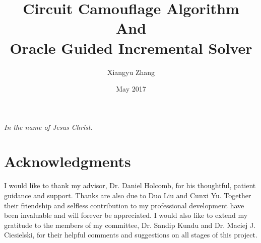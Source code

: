 \documentclass[thesis]{umassthesis}  %
\begin{document}
\title{Circuit Camouflage Algorithm\protect\\And\protect\\Oracle Guided Incremental Solver}
\author{Xiangyu Zhang}
\date{May 2017} %




\frontmatter
\maketitle
\signaturepage

\begin{dedication}              %
  \begin{center}
    \emph{In the name of Jesus Christ.}
  \end{center}
\end{dedication}


%
%
\chapter{Acknowledgments}             %
I would like to thank my advisor, Dr. Daniel Holcomb, for his thoughtful, patient guidance and support. Thanks are also due to Duo Liu and Cunxi Yu. Together their friendship and selfless contribution to my professional development have been invaluable and will forever be appreciated. I would also like to extend my gratitude to the members of my committee, Dr. Sandip Kundu and Dr. Maciej J. Ciesielski, for their helpful comments and suggestions on all stages of this project.\\
\end{document}
